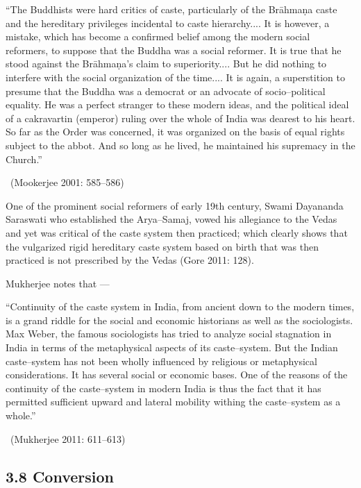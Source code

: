 \begin{myquote}
“The Buddhists were hard critics of caste, particularly of the Brāhmaṇa caste and the hereditary privileges incidental to caste hierarchy.... It is however, a mistake, which has become a confirmed belief among the modern social reformers, to suppose that the Buddha was a social reformer. It is true that he stood against the Brāhmaṇa’s claim to superiority.... But he did nothing to interfere with the social organization of the time.... It is again, a superstition to presume that the Buddha was a democrat or an advocate of socio–political equality. He was a perfect stranger to these modern ideas, and the political ideal of a cakravartin (emperor) ruling over the whole of India was dearest to his heart. So far as the Order was concerned, it was organized on the basis of equal rights subject to the abbot. And so long as he lived, he maintained his supremacy in the Church.” 

~\hfill (Mookerjee 2001: 585–586)
\end{myquote}

One of the prominent social reformers of early 19th century, Swami Dayananda Saraswati who established the Arya–Samaj, vowed his allegiance to the Vedas and yet was critical of the caste system then practiced; which clearly shows that the vulgarized rigid hereditary caste system based on birth that was then practiced is not prescribed by the Vedas (Gore 2011: 128).

Mukherjee notes that —

\begin{myquote}
“Continuity of the caste system in India, from ancient down to the modern times, is a grand riddle for the social and economic historians as well as the sociologists. Max Weber, the famous sociologists has tried to analyze social stagnation in India in terms of the metaphysical aspects of its caste–system. But the Indian caste–system has not been wholly influenced by religious or metaphysical considerations. It has several social or economic bases. One of the reasons of the continuity of the caste–system in modern India is thus the fact that it has permitted sufficient upward and lateral mobility withing the caste–system as a whole.” 

~\hfill (Mukherjee 2011: 611–613)
\end{myquote}


\subsection*{3.8 Conversion}

